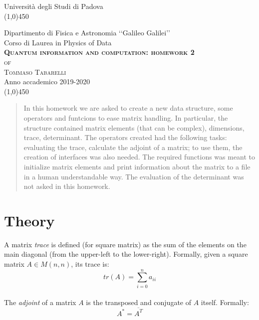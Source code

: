 \documentclass[12pt, a4paper, notitlepage]{report}
\begin{document}
\begin{titlepage}


\begin{center}
\LARGE{Università degli Studi di Padova}\\
\line(1,0){450}\\
\begin{figure}[H]
\centering

\end{figure}
\vspace{-1em}
\Large{Dipartimento di Fisica e Astronomia ‘‘Galileo Galilei’’}\\
\vspace{1em}
\Large{Corso di Laurea in Physics of Data}\\
\vspace{7em}
\Huge{\textsc{\textbf{Quantum information and computation: homework 2}}}\\
\vspace{2em}
\LARGE{\textsc{of}}\\
\vspace{1em}
\huge{\textsc{Tommaso Tabarelli}}\\
\vspace{8em}
\LARGE{Anno accademico 2019-2020}\\
\line(1,0){450}
\end{center}

\end{titlepage}

\begin{abstract}
	In this homework we are asked to create a new data structure, some operators and funtcions to ease matrix handling. In particular, the structure contained matrix elements (that can be complex), dimensions, trace, determinant. The operators created had the following tasks: evaluating the trace, calculate the adjoint of a matrix; to use them, the creation of interfaces was also needed. The required functions was meant to initialize matrix elements and print information about the matrix to a file in a human understandable way. The evaluation of the determinant was not asked in this homework.
\end{abstract}

\section*{Theory}
A matrix \textit{trace} is defined (for square matrix) as the sum of the elements on the main diagonal (from the upper-left to the lower-right). Formally, given a square matrix $A \in M(n,n)$, its trace is:
$$ tr(A) = \sum\limits_{i=0}^n a_{ii} $$ \\
The \textit{adjoint} of a matrix $A$ is the transposed and conjugate of $A$ itself. Formally:
$$ A^* = \overline{A^T} $$
\end{document}
